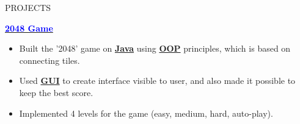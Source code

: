 \documentclass{resume} %
\begin{document}
\begin{rSection}{PROJECTS}
\item \href{https://gitlab.com/gturysbekov/game_2048/-/tree/master?ref_type=heads}{\textcolor{blue}{\textbf{2048 Game}} {\textcolor{black}{\small \faExternalLink}}} 
\vspace{-5pt} \item {} \hspace{0cm}  \hspace{0cm} 
\begin{itemize}
    \itemsep -5pt 
     \item Built the '2048' game on \underline {\textbf{Java}} using \underline{\textbf{OOP}} principles, which is based on connecting tiles.
     \item Used \underline {\textbf{GUI}} to create interface visible to user, and also made it possible to keep the best score.
     \item Implemented 4 levels for the game (easy, medium, hard, auto-play). 
 \end{itemize}
 
\end{rSection} 
\end{document}
